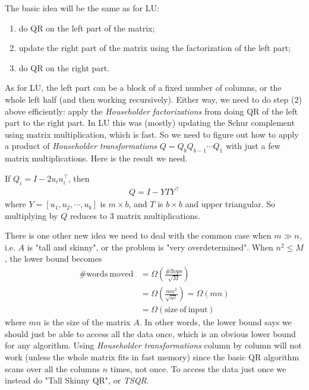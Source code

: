 \documentclass[11pt]{article}
\numberwithin{equation}{section}
\begin{document}
The basic idea will be the same as for LU: \begin{enumerate}
    \item do QR on the left part of the matrix;
    \item update the right part of the matrix using the factorization of the left part;
    \item do QR on the right part.
\end{enumerate}
As for LU, the left part can be a block of a fixed number of columns, or the whole left half (and then working recursively). Either way,
we need to do step (2) above efficiently: apply the \textit{Householder factorizations} from doing QR of the left part to the right part.
In LU this was (mostly) updating the Schur complement using matrix multiplication, which is fast. 
So we need to figure out how to apply a product of \textit{Householder transformations} $Q = Q_b Q_{b-1} \cdots Q_1$ with just a few matrix multiplications. 
Here is the result we need.

\begin{theorem}
    If $Q_{i}=I-2 u_{i} u_{i}^{\top}$, then \begin{align*}
        Q=I-Y T Y^{\top}
    \end{align*}
    where $Y=\left[u_{1}, u_{2},\cdots, u_{b}\right]$ is $m \times b$, and $T$ is $b\times b$ and upper triangular. So multiplying by $Q$ reduces to 3 matrix multiplications.
\end{theorem}

There is one other new idea we need to deal with the common case when $m \gg n$, i.e. $A$ is "tall and skinny", or the problem is "very overdetermined". 
When $n^2 \leq M$, the lower bound becomes \begin{align*}
    \#\mathrm{words \ moved} &= \Omega(\frac{\#\mathrm{flops}}{\sqrt{M}}) \\
    &= \Omega(\frac{mn^2}{\sqrt{n^2}}) = \Omega(mn) \\
    &= \Omega(\mathrm{size \ of \ input})
\end{align*}
where $mn$ is the size of the matrix $A$. In other words, the lower bound says we should just be able to access all the data once, 
which is an  obvious lower bound for any algorithm. Using \textit{Householder transformations} column by column will not work 
(unless the whole matrix fits in fast memory) since the basic QR algorithm scans over all the columns $n$ times, not once. 
To access the data just once we instead do "Tall Skinny QR", or \textit{TSQR}.
\end{document}
